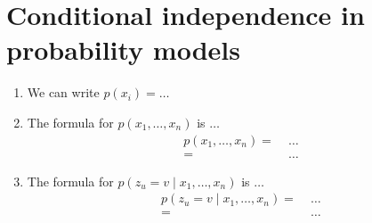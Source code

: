\section{Conditional independence in probability models}

\begin{enumerate} 
\item We can write $p(x_i) = \ldots$ 

\item The formula for $p(x_1, \dots, x_n)$ is $\ldots$ 
  \begin{align*}
    p(x_1, \dots, x_n) =&\; \ldots \\
    =&\; \ldots
  \end{align*}

\item The formula for $p(z_u = v \mid x_1, \dots, x_n)$ is $\ldots$ 
  \begin{align*}
    p(z_u = v \mid x_1, \dots, x_n) =&\; \ldots \\
    =&\; \ldots
  \end{align*}
\end{enumerate}
